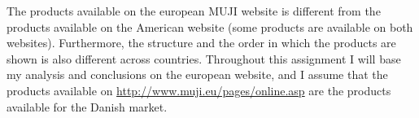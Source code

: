 The products available on the european MUJI website is different from the products available on the American website (some products are available on both websites). Furthermore, the structure and the order in which the products are shown is also different across countries. Throughout this assignment I will base my analysis and conclusions on the european website, and I assume that the products available on \url{http://www.muji.eu/pages/online.asp} are the products available for the Danish market.  